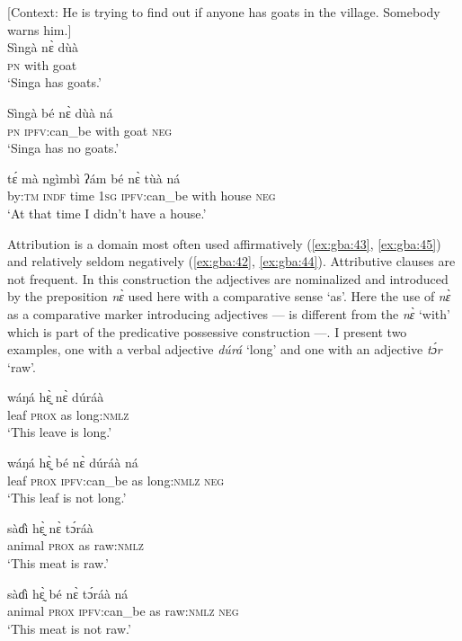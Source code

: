 \documentclass[output=paper,colorlinks=true, citecolor=brown]{langscibook}
\begin{document}
\ea\label{ex:gba:39} [Context: He is trying to find out if anyone has goats in the village. Somebody warns him.] \\
    \gll Sìngà nɛ̀ dùà  \\ 
          \textsc{pn} with goat \\
    \glt ‘Singa has goats.’
\z 
 
\ea\label{ex:gba:40}
    \gll Sìngà bé nɛ̀ dùà ná  \\ 
         \textsc{pn} \textsc{ipfv}:can\_be with goat \textsc{neg} \\
    \glt ‘Singa has no goats.’
\z 

\ea\label{ex:gba:41}
    \gll tɛ́ mà ngìmbì ʔám bé nɛ̀ tùà ná \\ 
         by\textsc{:tm} \textsc{indf} time 1\textsc{sg} \textsc{ipfv}:can\_be with house \textsc{neg} \\
    \glt ‘At that time I didn't have a house.’
\z 

Attribution is a domain most often used affirmatively (\ref{ex:gba:43}, \ref{ex:gba:45}) and relatively seldom negatively (\ref{ex:gba:42}, \ref{ex:gba:44}). Attributive clauses are not frequent. In this construction the adjectives are nominalized and introduced by the preposition \textit{nɛ̀} used here with a comparative sense ‘as’. Here the use of \textit{nɛ̀} as a comparative marker introducing adjectives --- is different from the \textit{nɛ̀} ‘with’ which is part of the predicative possessive construction ---. I present two examples, one with a verbal adjective \textit{dúrá} ‘long’ and one with an adjective \textit{tɔ́r} ‘raw’.

\ea\label{ex:gba:43}
    \gll wáŋá hɛ̰̀ nɛ̀ dúráà \\ 
         leaf \textsc{prox} as long:\textsc{nmlz} \\
    \glt ‘This leave is long.’
\z 

\ea\label{ex:gba:42} 
    \gll wáŋá hɛ̰̀  bé nɛ̀ dúráà ná \\ 
         leaf \textsc{prox} \textsc{ipfv}:can\_be as long:\textsc{nmlz} \textsc{neg}  \\
    \glt ‘This leaf is not long.’ 
\z 

\ea\label{ex:gba:45}
    \gll sàɗì hɛ̰̀ nɛ̀ tɔ́ráà  \\ 
         animal \textsc{prox} as raw:\textsc{nmlz}  \\
    \glt ‘This meat is raw.’
\z 

\ea\label{ex:gba:44}
    \gll sàɗì hɛ̰̀ bé nɛ̀ tɔ́ráà ná  \\ 
          animal \textsc{prox} \textsc{ipfv}:can\_be as raw:\textsc{nmlz} \textsc{neg}  \\
    \glt ‘This meat is not raw.’
\z 
\end{document}

